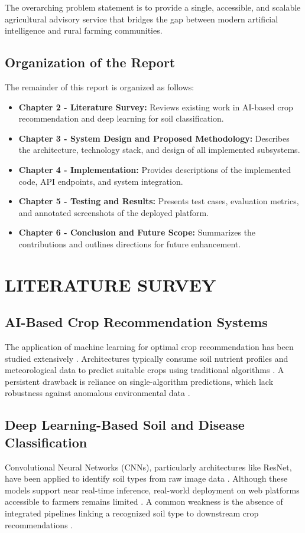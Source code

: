 \documentclass[12pt,a4paper]{report}
\begin{document}
The overarching problem statement is to provide a single, accessible, and scalable agricultural advisory service that bridges the gap between modern artificial intelligence and rural farming communities.

\section{Organization of the Report}

The remainder of this report is organized as follows:
\begin{itemize}
    \item \textbf{Chapter 2 - Literature Survey:} Reviews existing work in AI-based crop recommendation and deep learning for soil classification.
    \item \textbf{Chapter 3 - System Design and Proposed Methodology:} Describes the architecture, technology stack, and design of all implemented subsystems.
    \item \textbf{Chapter 4 - Implementation:} Provides descriptions of the implemented code, API endpoints, and system integration.
    \item \textbf{Chapter 5 - Testing and Results:} Presents test cases, evaluation metrics, and annotated screenshots of the deployed platform.
    \item \textbf{Chapter 6 - Conclusion and Future Scope:} Summarizes the contributions and outlines directions for future enhancement.
\end{itemize}

\chapter{LITERATURE SURVEY}

\section{AI-Based Crop Recommendation Systems}
The application of machine learning for optimal crop recommendation has been studied extensively \cite{1}. Architectures typically consume soil nutrient profiles and meteorological data to predict suitable crops using traditional algorithms \cite{2}. A persistent drawback is reliance on single-algorithm predictions, which lack robustness against anomalous environmental data \cite{4}.

\section{Deep Learning-Based Soil and Disease Classification}
Convolutional Neural Networks (CNNs), particularly architectures like ResNet, have been applied to identify soil types from raw image data \cite{5, 8}. Although these models support near real-time inference, real-world deployment on web platforms accessible to farmers remains limited \cite{6}. A common weakness is the absence of integrated pipelines linking a recognized soil type to downstream crop recommendations \cite{7}.
\end{document}
